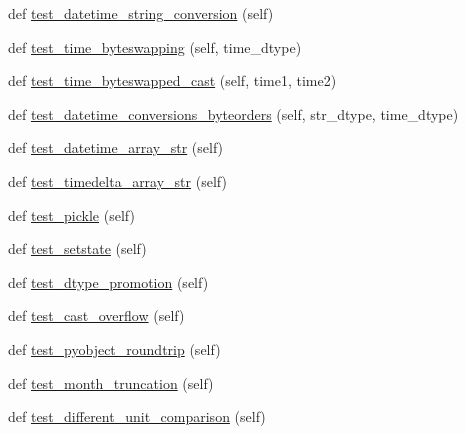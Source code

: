 \begin{DoxyCompactItemize}
def \hyperlink{classnumpy_1_1core_1_1tests_1_1test__datetime_1_1TestDateTime_a097a3ad27caf54077d58bce01cc51d6e}{test\+\_\+datetime\+\_\+string\+\_\+conversion} (self)
\item 
def \hyperlink{classnumpy_1_1core_1_1tests_1_1test__datetime_1_1TestDateTime_aef7d1c44e86daa017ef7f8e342952e8e}{test\+\_\+time\+\_\+byteswapping} (self, time\+\_\+dtype)
\item 
def \hyperlink{classnumpy_1_1core_1_1tests_1_1test__datetime_1_1TestDateTime_aebf9052ef000a2b27de9208793aff593}{test\+\_\+time\+\_\+byteswapped\+\_\+cast} (self, time1, time2)
\item 
def \hyperlink{classnumpy_1_1core_1_1tests_1_1test__datetime_1_1TestDateTime_aa240797fbb1a11a776635e43dd010ac6}{test\+\_\+datetime\+\_\+conversions\+\_\+byteorders} (self, str\+\_\+dtype, time\+\_\+dtype)
\item 
def \hyperlink{classnumpy_1_1core_1_1tests_1_1test__datetime_1_1TestDateTime_a7d1a017a7b64233a238e55decb83217c}{test\+\_\+datetime\+\_\+array\+\_\+str} (self)
\item 
def \hyperlink{classnumpy_1_1core_1_1tests_1_1test__datetime_1_1TestDateTime_a76b0b4f14ba6da6e94158c7756dfc100}{test\+\_\+timedelta\+\_\+array\+\_\+str} (self)
\item 
def \hyperlink{classnumpy_1_1core_1_1tests_1_1test__datetime_1_1TestDateTime_a31c3d33942256b70ed4915017d850336}{test\+\_\+pickle} (self)
\item 
def \hyperlink{classnumpy_1_1core_1_1tests_1_1test__datetime_1_1TestDateTime_ab4ee135ff7d2f0be81c1461a58f232c9}{test\+\_\+setstate} (self)
\item 
def \hyperlink{classnumpy_1_1core_1_1tests_1_1test__datetime_1_1TestDateTime_a39ad95676cc73468b9162193bf61446b}{test\+\_\+dtype\+\_\+promotion} (self)
\item 
def \hyperlink{classnumpy_1_1core_1_1tests_1_1test__datetime_1_1TestDateTime_a51d232b5d59707e9551ddc3723c72fd2}{test\+\_\+cast\+\_\+overflow} (self)
\item 
def \hyperlink{classnumpy_1_1core_1_1tests_1_1test__datetime_1_1TestDateTime_aa6a0c81ab8bf5eb8b70110439b4480ea}{test\+\_\+pyobject\+\_\+roundtrip} (self)
\item 
def \hyperlink{classnumpy_1_1core_1_1tests_1_1test__datetime_1_1TestDateTime_aa3370e96e3d8da9ac1bfea8e4ac213d0}{test\+\_\+month\+\_\+truncation} (self)
\item 
def \hyperlink{classnumpy_1_1core_1_1tests_1_1test__datetime_1_1TestDateTime_ae657c73b0bb3fc88a8194e7430a0293e}{test\+\_\+different\+\_\+unit\+\_\+comparison} (self)

\end{DoxyCompactItemize}
